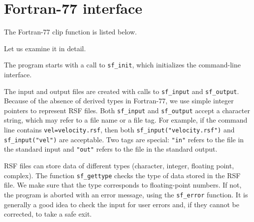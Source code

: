 \section{Fortran-77 interface}

\lstset{language=fortran}

The Fortran-77 clip function is listed below.



Let us examine it in detail.


The program starts with a call to \texttt{sf\_init}, which initializes the
command-line interface.

 The
input and output files are created with calls to \texttt{sf\_input} and
\texttt{sf\_output}. Because of the absence of derived types in Fortran-77, we
use simple integer pointers to represent RSF files. Both \texttt{sf\_input}
and \texttt{sf\_output} accept a character string, which may refer to a file
name or a file tag. For example, if the command line contains
\texttt{vel=velocity.rsf}, then both \texttt{sf\_input("velocity.rsf")} and
\texttt{sf\_input("vel")} are acceptable. Two tags are special: \texttt{"in"}
refers to the file in the standard input and \texttt{"out"} refers to the file
in the standard output.

 RSF
files can store data of different types (character, integer, floating point,
complex). The function \texttt{sf\_gettype} checks the type of data stored in
the RSF file. We make sure that the type corresponds to floating-point
numbers. If not, the program is aborted with an error message, using the
\texttt{sf\_error} function.  It is generally a good idea to check the input
for user errors and, if they cannot be corrected, to take a safe exit.

